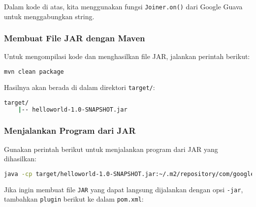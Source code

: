 Dalam kode di atas, kita menggunakan fungsi \texttt{Joiner.on()} dari Google Guava untuk menggabungkan string.

\subsubsection{Membuat File JAR dengan Maven}
Untuk mengompilasi kode dan menghasilkan file JAR, jalankan perintah berikut:

\begin{lstlisting}[language=bash]
	mvn clean package
\end{lstlisting}

Hasilnya akan berada di dalam direktori \texttt{target/}:

\begin{lstlisting}[language=bash]
	target/
	|-- helloworld-1.0-SNAPSHOT.jar
\end{lstlisting}

\subsubsection{Menjalankan Program dari JAR}
Gunakan perintah berikut untuk menjalankan program dari JAR yang dihasilkan:

\begin{lstlisting}[language=bash]
	java -cp target/helloworld-1.0-SNAPSHOT.jar:~/.m2/repository/com/google/guava/guava/31.1-jre/guava-31.1-jre.jar com.example.Main
\end{lstlisting}

Jika ingin membuat file \texttt{JAR} yang dapat langsung dijalankan dengan opsi \texttt{-jar}, tambahkan \texttt{plugin} berikut ke dalam \texttt{pom.xml}:

